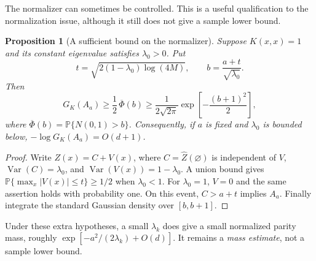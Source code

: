 \documentclass[11pt]{article}
\newtheorem{proposition}[theorem]{Proposition}
\theoremstyle{remark}\newtheorem{remark}[theorem]{Remark}
\newcommand{\PP}{\mathbb P}
\newcommand{\abs}[1]{\left|#1\right|}
\begin{document}
The normalizer can sometimes be controlled. This is a useful qualification to the normalization issue, although it still does not give a sample lower bound.
\begin{proposition}[A sufficient bound on the normalizer]\label{prop:normalizer}
Suppose $K(x,x)=1$ and its constant eigenvalue satisfies $\lambda_0>0$. Put
\[
 t=\sqrt{2(1-\lambda_0)\log(4M)},\qquad
 b=\frac{a+t}{\sqrt{\lambda_0}}.
\]
Then
\begin{equation}\label{eq:normalizer}
 G_K(A_a)\ge \frac12\,\overline\Phi(b)
 \ge\frac{1}{2\sqrt{2\pi}}\exp\!\left[-\frac{(b+1)^2}{2}\right],
\end{equation}
where $\overline\Phi(b)=\PP\{N(0,1)>b\}$. Consequently, if $a$ is fixed and $\lambda_0$ is bounded below, $-\log G_K(A_a)=O(d+1)$.
\end{proposition}
\begin{proof}
Write $Z(x)=C+V(x)$, where $C=\widehat Z(\varnothing)$ is independent of $V$, $\operatorname{Var}(C)=\lambda_0$, and $\operatorname{Var}(V(x))=1-\lambda_0$. A union bound gives $\PP\{\max_x\abs{V(x)}\le t\}\ge1/2$ when $\lambda_0<1$. For $\lambda_0=1$, $V=0$ and the same assertion holds with probability one. On this event, $C>a+t$ implies $A_a$. Finally integrate the standard Gaussian density over $[b,b+1]$.
\end{proof}
Under these extra hypotheses, a small $\lambda_k$ does give a small normalized parity mass, roughly $\exp[-a^2/(2\lambda_k)+O(d)]$. It remains a \emph{mass estimate}, not a sample lower bound.
\end{document}
